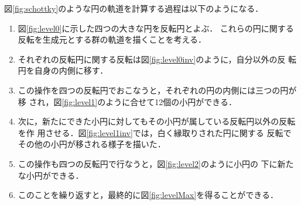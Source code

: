 図\ref{fig:schottky}のような円の軌道を計算する過程は以下のようになる．
\begin{enumerate}
 \item 図\ref{fig:level0}に示した四つの大きな円を反転円とよぶ．
       これらの円に関する反転を生成元とする群の軌道を描くことを考える．
 \item それぞれの反転円に関する反転は図\ref{fig:level0inv}のように，自分以外の反
       転円を自身の内側に移す．
 \item この操作を四つの反転円でおこなうと，それぞれの円の内側には三つの円が移
       され，図\ref{fig:level1}のように合せて12個の小円ができる．
 \item 次に，新たにできた小円に対してもその小円が属している反転円以外の反転を作
       用させる．図\ref{fig:level1inv}では，白く縁取りされた円に関する
       反転でその他の小円が移される様子を描いた．
 \item この操作も四つの反転円で行なうと，図\ref{fig:level2}のように小円の
       下に新たな小円ができる．
 \item このことを繰り返すと，最終的に図\ref{fig:levelMax}を得ることができる．
\end{enumerate}

